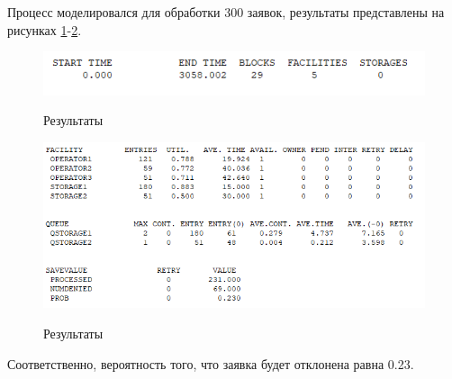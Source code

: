 Процесс моделировался для обработки 300 заявок, результаты представлены на рисунках \ref{fig5:image}-\ref{fig6:image}.

\begin{figure}[h]
	\begin{center}
		{\includegraphics[scale = 0.8]{img/res1.png}}
		\caption{Результаты}
		\label{fig5:image}
	\end{center}
\end{figure}

\begin{figure}[h]
	\begin{center}
		{\includegraphics[scale = 0.8]{img/res2.png}}
		\caption{Результаты}
		\label{fig6:image}
	\end{center}
\end{figure}

Соответственно, вероятность того, что заявка будет отклонена равна 0.23.